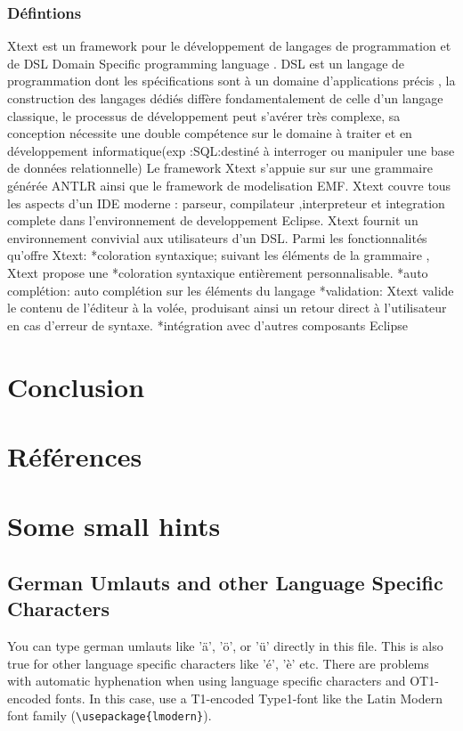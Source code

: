 \documentclass{article}
\begin{document}
\subsubsection{Défintions}
	Xtext est un framework pour le développement de langages de programmation et de DSL Domain Specific programming language .
DSL est un langage de programmation dont les spécifications sont à un domaine d’applications précis , la construction des langages dédiés diffère fondamentalement de celle d’un langage classique, le processus de développement  peut s'avérer très complexe, sa conception nécessite une double compétence sur le domaine à traiter et en développement informatique(exp :SQL:destiné à interroger ou manipuler une base de données relationnelle)
Le framework Xtext s’appuie sur sur une grammaire générée ANTLR ainsi que le framework de modelisation EMF.
Xtext couvre tous les aspects d’un IDE moderne : parseur, compilateur ,interpreteur et integration complete dans l’environnement de developpement Eclipse.
Xtext fournit un environnement convivial aux utilisateurs d’un DSL.
Parmi les fonctionnalités qu’offre Xtext:
*coloration syntaxique; suivant les éléments de la grammaire , Xtext propose une *coloration syntaxique entièrement personnalisable.
*auto complétion: auto complétion sur les éléments du langage 
*validation: Xtext valide le contenu de l'éditeur à la volée, produisant ainsi un retour direct à l’utilisateur en cas d’erreur de syntaxe.
*intégration avec d’autres composants Eclipse 

\section{Conclusion}
\label{hints}

\section{Références}
\label{hints}
\section{Some small hints}
\label{hints}
\subsection{German Umlauts and other Language Specific Characters}
\label{umlauts}
You can type german umlauts like 'ä', 'ö', or 'ü' directly in this file.
This is also true for other language specific characters like 'é', 'è' etc.
There are problems with automatic hyphenation when using language
specific characters and OT1-encoded fonts. In this case, use a
T1-encoded Type1-font like the Latin Modern font family (\verb#\usepackage{lmodern}#).
\end{document}
